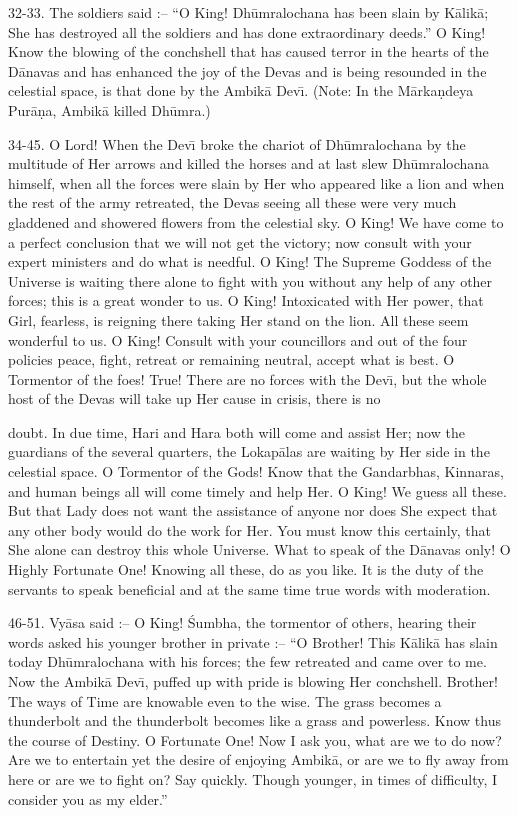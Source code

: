 32-33. The soldiers said :-- ``O King! Dh\=umralochana has been slain by K\=alik\=a; She has destroyed all the soldiers and has done extraordinary deeds.'' O King! Know the blowing of the conchshell that has caused terror in the hearts of the D\=anavas and has enhanced the joy of the Devas and is being resounded in the celestial space, is that done by the Ambik\=a Dev\={\i}. (Note: In the M\=arka\d{n}deya Pur\=a\d{n}a, Ambik\=a killed Dh\=umra.)

34-45. O Lord! When the Dev\={\i} broke the chariot of Dh\=umralochana by the multitude of Her arrows and killed the horses and at last slew Dh\=umralochana himself, when all the forces were slain by Her who appeared like a lion and when the rest of the army retreated, the Devas seeing all these were very much gladdened and showered flowers from the celestial sky. O King! We have come to a perfect conclusion that we will not get the victory; now consult with your expert ministers and do what is needful. O King! The Supreme Goddess of the Universe is waiting there alone to fight with you without any help of any other forces; this is a great wonder to us. O King! Intoxicated with Her power, that Girl, fearless, is reigning there taking Her stand on the lion. All these seem wonderful to us. O King! Consult with your councillors and out of the four policies peace, fight, retreat or remaining neutral, accept what is best. O Tormentor of the foes! True! There are no forces with the Dev\={\i}, but the whole host of the Devas will take up Her cause in crisis, there is no

doubt. In due time, Hari and Hara both will come and assist Her; now the guardians of the several quarters, the Lokap\=alas are waiting by Her side in the celestial space. O Tormentor of the Gods! Know that the Gandarbhas, Kinnaras, and human beings all will come timely and help Her. O King! We guess all these. But that Lady does not want the assistance of anyone nor does She expect that any other body would do the work for Her. You must know this certainly, that She alone can destroy this whole Universe. What to speak of the D\=anavas only! O Highly Fortunate One! Knowing all these, do as you like. It is the duty of the servants to speak beneficial and at the same time true words with moderation.

46-51. Vy\=asa said :-- O King! \'Sumbha, the tormentor of others, hearing their words asked his younger brother in private :-- ``O Brother! This K\=alik\=a has slain today Dh\=umralochana with his forces; the few retreated and came over to me. Now the Ambik\=a Dev\={\i}, puffed up with pride is blowing Her conchshell. Brother! The ways of Time are knowable even to the wise. The grass becomes a thunderbolt and the thunderbolt becomes like a grass and powerless. Know thus the course of Destiny. O Fortunate One! Now I ask you, what are we to do now? Are we to entertain yet the desire of enjoying Ambik\=a, or are we to fly away from here or are we to fight on? Say quickly. Though younger, in times of difficulty, I consider you as my elder.''

